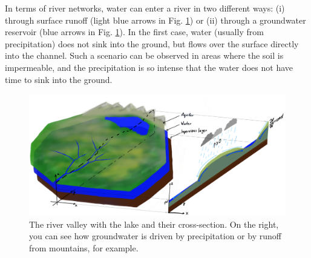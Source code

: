 \documentclass[]{pracamgr}
\begin{document}
    In terms of river networks, water can enter a river in two different ways: (i) through surface runoff (light blue arrows in Fig. \ref{pow_wsiakanie}) or (ii) through a groundwater reservoir (blue arrows in Fig. \ref{pow_wsiakanie}). In the first case, water (usually from precipitation) does not sink into the ground, but flows over the surface directly into the channel. Such a scenario can be observed in areas where the soil is impermeable, and the precipitation is so intense that the water does not have time to sink into the ground.

    \begin{figure}[H]
      \centering
      \includegraphics[width=1\textwidth]{figs/basic_river_illustration.png}
      \caption{The river valley with the lake and their cross-section. On the right, you can see how groundwater is driven by precipitation or by runoff from mountains, for example.}
      \label{pow_wsiakanie}
    \end{figure}
\end{document}
